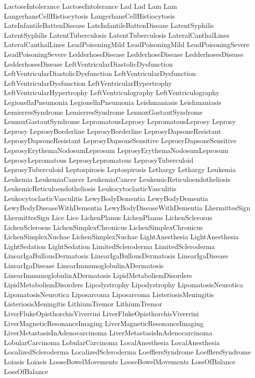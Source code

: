  LactoseIntolerance
 LactoseIntolerance
 Lad
 Lad
 Lam
 Lam
 LangerhansCellHistiocytosis
 LangerhansCellHistiocytosis
 LateInfantileBattenDisease
 LateInfantileBattenDisease
 LatentSyphilis
 LatentSyphilis
 LatentTuberculosis
 LatentTuberculosis
 LateralCanthalLines
 LateralCanthalLines
 LeadPoisoningMild
 LeadPoisoningMild
 LeadPoisoningSevere
 LeadPoisoningSevere
 LedderhoseDisease
 LedderhoseDisease
 LedderhosesDisease
 LedderhosesDisease
 LeftVentricularDiastolicDysfunction
 LeftVentricularDiastolicDysfunction
 LeftVentricularDysfunction
 LeftVentricularDysfunction
 LeftVentricularHypertrophy
 LeftVentricularHypertrophy
 LeftVentriculography
 LeftVentriculography
 LegionellaPneumonia
 LegionellaPneumonia
 Leishmaniasis
 Leishmaniasis
 LemierresSyndrome
 LemierresSyndrome
 LennoxGastautSyndrome
 LennoxGastautSyndrome
 LepromatousLeprosy
 LepromatousLeprosy
 Leprosy
 Leprosy
 LeprosyBorderline
 LeprosyBorderline
 LeprosyDapsoneResistant
 LeprosyDapsoneResistant
 LeprosyDapsoneSensitive
 LeprosyDapsoneSensitive
 LeprosyErythemaNodosumLeprosum
 LeprosyErythemaNodosumLeprosum
 LeprosyLepromatous
 LeprosyLepromatous
 LeprosyTuberculoid
 LeprosyTuberculoid
 Leptospirosis
 Leptospirosis
 Lethargy
 Lethargy
 Leukemia
 Leukemia
 LeukemiaCancer
 LeukemiaCancer
 LeukemicReticuloendotheliosis
 LeukemicReticuloendotheliosis
 LeukocytoclasticVasculitis
 LeukocytoclasticVasculitis
 LewyBodyDementia
 LewyBodyDementia
 LewyBodyDiseaseWithDementia
 LewyBodyDiseaseWithDementia
 LhermittesSign
 LhermittesSign
 Lice
 Lice
 LichenPlanus
 LichenPlanus
 LichenSclerosus
 LichenSclerosus
 LichenSimplexChronicus
 LichenSimplexChronicus
 LichenSimplexNuchae
 LichenSimplexNuchae
 LightAnesthesia
 LightAnesthesia
 LightSedation
 LightSedation
 LimitedScleroderma
 LimitedScleroderma
 LinearIgaBullousDermatosis
 LinearIgaBullousDermatosis
 LinearIgaDisease
 LinearIgaDisease
 LinearImmunoglobulinADermatosis
 LinearImmunoglobulinADermatosis
 LipidMetabolismDisorders
 LipidMetabolismDisorders
 Lipodystrophy
 Lipodystrophy
 LipomatosisNeurotica
 LipomatosisNeurotica
 Liposarcoma
 Liposarcoma
 ListeriosisMeningitis
 ListeriosisMeningitis
 LithiumTremor
 LithiumTremor
 LiverFlukeOpisthorchisViverrini
 LiverFlukeOpisthorchisViverrini
 LiverMagneticResonanceImaging
 LiverMagneticResonanceImaging
 LiverMetastasisInAdenocarcinoma
 LiverMetastasisInAdenocarcinoma
 LobularCarcinoma
 LobularCarcinoma
 LocalAnesthesia
 LocalAnesthesia
 LocalizedScleroderma
 LocalizedScleroderma
 LoefflersSyndrome
 LoefflersSyndrome
 Loiasis
 Loiasis
 LooseBowelMovements
 LooseBowelMovements
 LossOfBalance
 LossOfBalance
